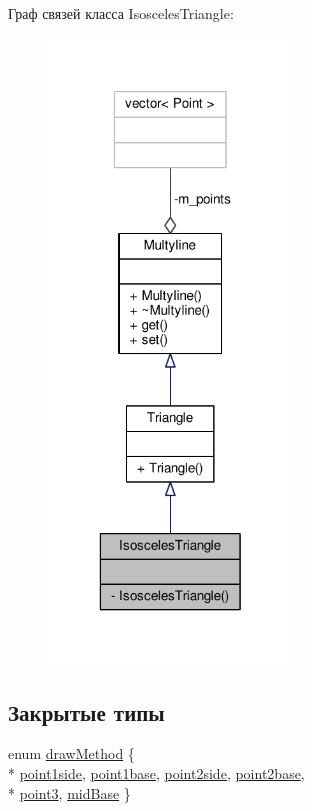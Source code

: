 Граф связей класса Isosceles\-Triangle\-:
\nopagebreak
\begin{figure}[H]
\begin{center}
\leavevmode
\includegraphics[width=184pt]{class_isosceles_triangle__coll__graph}
\end{center}
\end{figure}
\subsection*{Закрытые типы}
\begin{DoxyCompactItemize}
\item 
enum \hyperlink{class_isosceles_triangle_ae25b85b6ba464d8f3394eeb7b39215ff}{draw\-Method} \{ \\*
\hyperlink{class_isosceles_triangle_ae25b85b6ba464d8f3394eeb7b39215ffaff80e9fadb19575656ecfff8153263c5}{point1side}, 
\hyperlink{class_isosceles_triangle_ae25b85b6ba464d8f3394eeb7b39215ffa5a175df028aa43075ab3edfe61cd58dc}{point1base}, 
\hyperlink{class_isosceles_triangle_ae25b85b6ba464d8f3394eeb7b39215ffaca9db2a039060931ad41b18328f036a1}{point2side}, 
\hyperlink{class_isosceles_triangle_ae25b85b6ba464d8f3394eeb7b39215ffa1977a9bc1cb903b2be31a411f7fcc503}{point2base}, 
\\*
\hyperlink{class_isosceles_triangle_ae25b85b6ba464d8f3394eeb7b39215ffa24bfe64dc398220e2049528b88ddfeb2}{point3}, 
\hyperlink{class_isosceles_triangle_ae25b85b6ba464d8f3394eeb7b39215ffa56c68a99c41763d92f5f9d6a78e583a6}{mid\-Base}
 \}
\end{DoxyCompactItemize}
